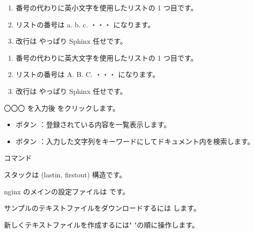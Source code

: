 \documentclass[letterpaper,10pt,dvipdfmx]{sphinxmanual}
\begin{document}
\begin{enumerate}
%
\item {} 
\sphinxAtStartPar
番号の代わりに英小文字を使用したリストの 1 つ目です。

\item {} 
\sphinxAtStartPar
リストの番号は a. b. c. ・・・ になります。

\item {} 
\sphinxAtStartPar
改行は
やっぱり Sphinx 任せです。

\end{enumerate}
\begin{enumerate}
%
\item {} 
\sphinxAtStartPar
番号の代わりに英大文字を使用したリストの 1 つ目です。

\item {} 
\sphinxAtStartPar
リストの番号は A. B. C. ・・・ になります。

\item {} 
\sphinxAtStartPar
改行は
やっぱり Sphinx 任せです。

\end{enumerate}

\sphinxAtStartPar
〇〇〇 を入力後  をクリックします。
\begin{itemize}
\item {} 
\sphinxAtStartPar
{} ボタン ：登録されている内容を一覧表示します。

\item {} 
\sphinxAtStartPar
{} ボタン ：入力した文字列をキーワードにしてドキュメント内を検索します。

\end{itemize}

\sphinxAtStartPar
{} コマンド

\sphinxAtStartPar
スタックは  (last\sphinxhyphen{}in, first\sphinxhyphen{}out) 構造です。

\sphinxAtStartPar
nginx のメインの設定ファイルは  です。

\sphinxAtStartPar
サンプルのテキストファイルをダウンロードするには  します。

\sphinxAtStartPar
新しくテキストファイルを作成するには"  "の順に操作します。
\end{document}
